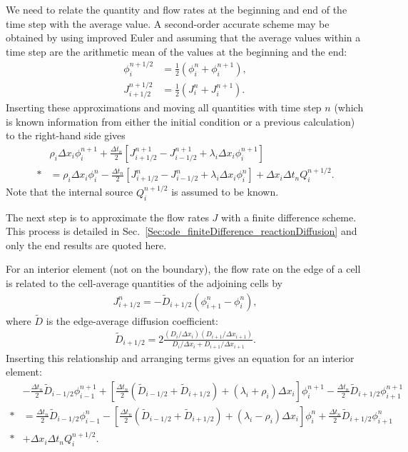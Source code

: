 We need to relate the quantity and flow rates at the beginning and end of the time step with the average value. A second-order accurate scheme may be obtained by using improved Euler and assuming that the average values within a time step are the arithmetic mean of the values at the beginning and the end:
\begin{subequations}
\begin{align}
  \phi_i^{n+1/2}    &= \frac{1}{2} \left( \phi_i^n + \phi_i^{n+1} \right) , \\
  J_{i+1/2}^{n+1/2} &= \frac{1}{2} \left( J_i^n    + J_i^{n+1}    \right) .
\end{align}
\end{subequations}
Inserting these approximations and moving all quantities with time step $n$ (which is known information from either the initial condition or a previous calculation) to the right-hand side gives
\begin{align}
  &\rho_i \Delta x_i \phi_i^{n+1} + \frac{\Delta t_n}{2} \left[ J_{i+1/2}^{n+1} - J_{i-1/2}^{n+1} + \lambda_i \Delta x_i \phi_i^{n+1} \right] \nonumber \\*
  &= \rho_i \Delta x_i \phi_i^n -  \frac{\Delta t_n}{2} \left[ J_{i+1/2}^{n} - J_{i-1/2}^{n} + \lambda_i \Delta x_i \phi_i^{n} \right] + \Delta x_i \Delta t_n Q_i^{n+1/2}.
\end{align}
Note that the internal source $Q_i^{n+1/2}$ is assumed to be known.

The next step is to approximate the flow rates $J$ with a finite difference scheme. This process is detailed in Sec.~\ref{Sec:ode_finiteDifference_reactionDiffusion} and only the end results are quoted here. 

For an interior element (not on the boundary), the flow rate on the edge of a cell is related to the cell-average quantities of the adjoining cells by
\begin{align}
  J_{i+1/2}^n = -\widetilde{D}_{i+1/2} \left( \phi_{i+1}^n - \phi_i^n \right) ,
\end{align}
where $\widetilde{D}$ is the edge-average diffusion coefficient:
\begin{align}
  \widetilde{D}_{i+1/2} = 2 \frac{ ( D_{i} / \Delta x_{i} ) ( D_{i+1} / \Delta x_{i+1} ) }{ D_{i} / \Delta x_{i} + D_{i+1} / \Delta x_{i+1} } .
\end{align}
Inserting this relationship and arranging terms gives an equation for an interior element:
\begin{align}
  &-\frac{ \Delta t_n }{2} \widetilde{D}_{i-1/2} \phi_{i-1}^{n+1} 
  + \left[ \frac{ \Delta t_n }{2} \left( \widetilde{D}_{i-1/2} + \widetilde{D}_{i+1/2} \right) + ( \lambda_i + \rho_i ) \Delta x_i \right] \phi_i^{n+1}
  -\frac{ \Delta t_n }{2} \widetilde{D}_{i+1/2} \phi_{i+1}^{n+1} \nonumber \\*
  &= \frac{ \Delta t_n }{2} \widetilde{D}_{i-1/2} \phi_{i-1}^{n} 
  - \left[ \frac{ \Delta t_n }{2} \left( \widetilde{D}_{i-1/2} + \widetilde{D}_{i+1/2} \right) + ( \lambda_i - \rho_i ) \Delta x_i \right] \phi_i^{n}
  +\frac{ \Delta t_n }{2} \widetilde{D}_{i+1/2} \phi_{i+1}^{n} \nonumber \\*
  &+ \Delta x_i \Delta t_n Q_i^{n+1/2}.
\end{align}

